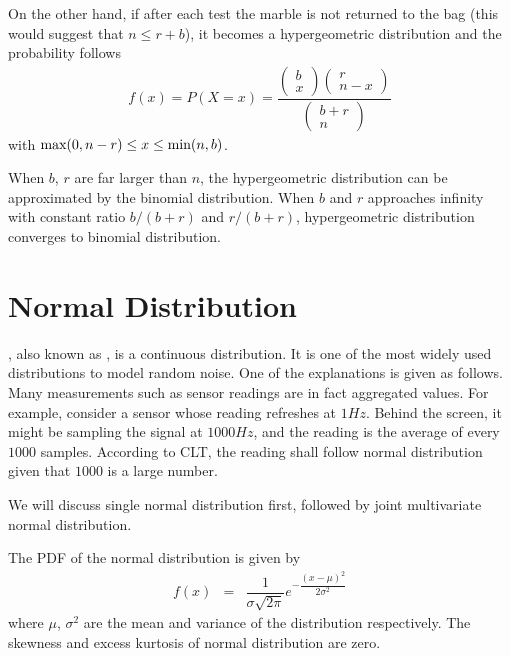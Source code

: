 On the other hand, if after each test the marble is not returned to the bag (this would suggest that $n\leq r+b$), it becomes a hypergeometric distribution and the probability follows
\begin{eqnarray}
	f(x) = P(X=x) = \dfrac{\left(\begin{array}{c}
			b \\
			x
		\end{array}\right)\left(\begin{array}{c}
			r \\
			n-x
		\end{array}\right)}{\left(\begin{array}{c}
			b+r \\
			n
		\end{array}\right)} \nonumber
\end{eqnarray}
with $\textup{max}(0, n-r) \leq x \leq \textup{min}(n, b)$.

When $b$, $r$ are far larger than $n$, the hypergeometric distribution can be approximated by the binomial distribution. When $b$ and $r$ approaches infinity with constant ratio $b/(b+r)$ and $r/(b+r)$, hypergeometric distribution converges to binomial distribution.

\section{Normal Distribution} \label{sec:normal-distribution}

, also known as , is a continuous distribution. It is one of the most widely used distributions to model random noise. One of the explanations is given as follows. Many measurements such as sensor readings are in fact aggregated values. For example, consider a sensor whose reading refreshes at $1Hz$. Behind the screen, it might be sampling the signal at $1000Hz$, and the reading is the average of every $1000$ samples. According to CLT, the reading shall follow normal distribution given that $1000$ is a large number.

We will discuss single normal distribution first, followed by joint multivariate normal distribution.

The PDF of the normal distribution is given by
\begin{eqnarray}
	f(x) &=& \dfrac{1}{\sigma\sqrt{2\pi}}e^{-\dfrac{(x-\mu)^2}{2\sigma^2}} \nonumber
\end{eqnarray}
where $\mu$, $\sigma^2$ are the mean and variance of the distribution respectively. The skewness and excess kurtosis of normal distribution are zero.

